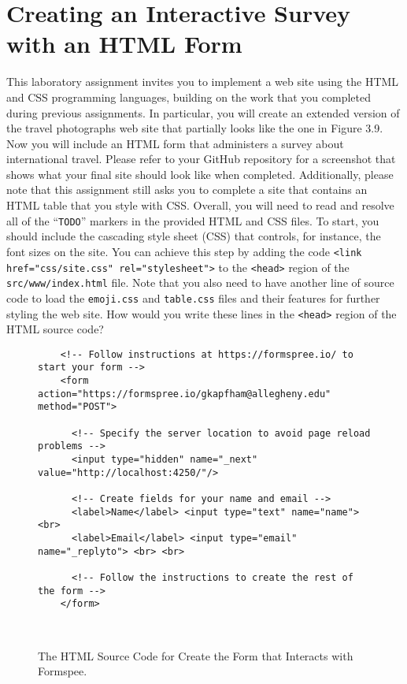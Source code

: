 \documentclass[11pt]{article}
\newcommand{\mainprogramsource}{\lstinline{src/www/index.html}}
\newcommand{\command}[1]{``\lstinline{#1}''}
\newcommand{\program}[1]{\lstinline{#1}}
\begin{document}
\section*{Creating an Interactive Survey with an HTML Form}

This laboratory assignment invites you to implement a web site using the HTML
and CSS programming languages, building on the work that you completed during
previous assignments. In particular, you will create an extended version of the
travel photographs web site that partially looks like the one in Figure 3.9. Now
you will include an HTML form that administers a survey about international
travel. Please refer to your GitHub repository for a screenshot that shows what
your final site should look like when completed. Additionally, please note that
this assignment still asks you to complete a site that contains an HTML table
that you style with CSS. Overall, you will need to read and resolve all of the
\command{TODO} markers in the provided HTML and CSS files. To start, you should
include the cascading style sheet (CSS) that controls, for instance, the font
sizes on the site. You can achieve this step by adding the code \program{<link
href="css/site.css" rel="stylesheet">} to the \program{<head>} region of the
\mainprogramsource{} file. Note that you also need to have another line of
source code to load the \program{emoji.css} and \program{table.css} files and
their features for further styling the web site. How would you write these lines
in the \program{<head>} region of the HTML source code?

\begin{figure}[t]
  \centering
  \begin{verbatim}
    <!-- Follow instructions at https://formspree.io/ to start your form -->
    <form action="https://formspree.io/gkapfham@allegheny.edu" method="POST">

      <!-- Specify the server location to avoid page reload problems -->
      <input type="hidden" name="_next" value="http://localhost:4250/"/>

      <!-- Create fields for your name and email -->
      <label>Name</label> <input type="text" name="name"> <br>
      <label>Email</label> <input type="email" name="_replyto"> <br> <br>

      <!-- Follow the instructions to create the rest of the form -->
    </form>
  \end{verbatim}
  \vspace*{-.35in}
  \caption{The HTML Source Code for Create the Form that Interacts with Formspee.}~\label{fig:form}
  \vspace*{-.25in}
\end{figure}
\end{document}
